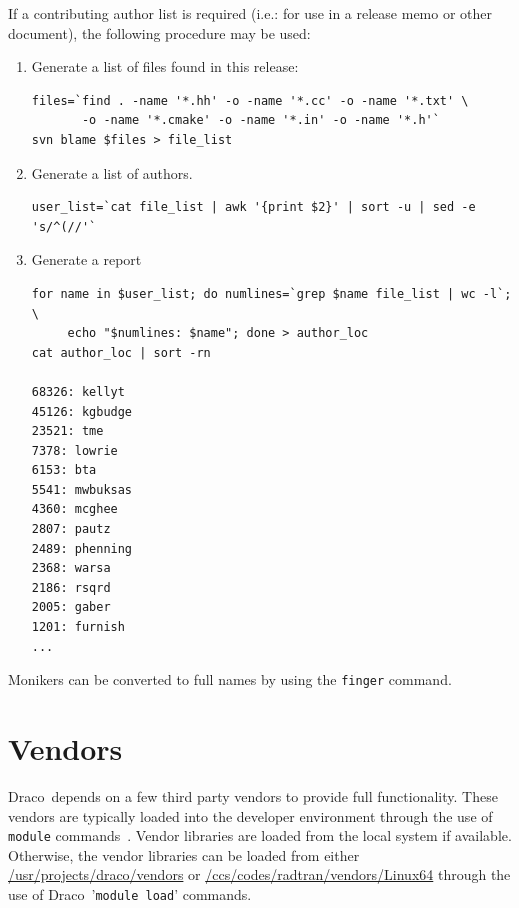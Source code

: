 \documentclass[note]{newmemo}
\newcommand{\draco}{{\normalfont\small\sffamily Draco}}
\begin{document}
If a contributing author list is required (i.e.: for use in a release
memo or other document), the following procedure may be used:

\begin{enumerate}
\item Generate a list of files found in this release:
\begin{lstlisting}[basicstyle=\footnotesize, xleftmargin=0.75in, 
  xrightmargin=0.75in]
files=`find . -name '*.hh' -o -name '*.cc' -o -name '*.txt' \
       -o -name '*.cmake' -o -name '*.in' -o -name '*.h'`
svn blame $files > file_list
\end{lstlisting}
\item Generate a list of authors.
\begin{lstlisting}[basicstyle=\footnotesize, xleftmargin=0.75in, 
  xrightmargin=0.75in]
user_list=`cat file_list | awk '{print $2}' | sort -u | sed -e 's/^(//'`
\end{lstlisting}
\item Generate a report
\begin{lstlisting}[basicstyle=\footnotesize, xleftmargin=0.75in, 
  xrightmargin=0.75in]
for name in $user_list; do numlines=`grep $name file_list | wc -l`; \
     echo "$numlines: $name"; done > author_loc
cat author_loc | sort -rn

68326: kellyt
45126: kgbudge
23521: tme
7378: lowrie
6153: bta
5541: mwbuksas
4360: mcghee
2807: pautz
2489: phenning
2368: warsa
2186: rsqrd
2005: gaber
1201: furnish
...
\end{lstlisting}
\end{enumerate}

Monikers can be converted to full names by using the \texttt{finger}
command. 


\section{Vendors}
\label{sec:vendors}

\draco\ depends on a few third party vendors to provide full
functionality.  These vendors are typically loaded into the developer
environment through the use of \texttt{module}
commands~\cite{modulecmd}.  Vendor libraries are loaded from the local
system if available.  Otherwise, the vendor libraries can be loaded
from either \url{/usr/projects/draco/vendors} or
\url{/ccs/codes/radtran/vendors/Linux64} through the use of
\draco\ '\texttt{module load}' commands.
\end{document}
